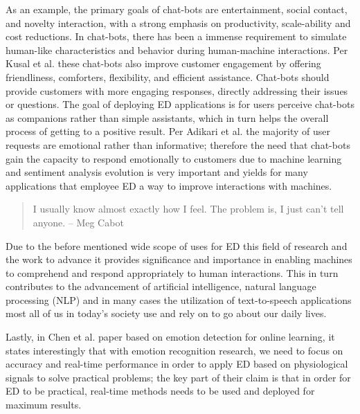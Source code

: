 \documentclass[11pt]{article}
\begin{document}
As an example, the primary goals of chat-bots are entertainment, social contact, and novelty interaction, with a strong emphasis on productivity, scale-ability and cost reductions. In chat-bots, there has been a immense requirement to simulate human-like characteristics and behavior during human-machine interactions\cite{emotion-detection-literature-review}. Per Kusal et al. \cite{chatbot-cognitive-awareness} these chat-bots also improve customer engagement by offering friendliness, comforters, flexibility, and efficient assistance. Chat-bots should provide customers with more engaging responses, directly addressing their issues or questions. The goal of deploying ED applications is for users perceive chat-bots as companions rather than simple assistants, which in turn helps the overall process of getting to a positive result. Per Adikari et al. the majority of user requests are emotional rather than informative; therefore the need that chat-bots gain the capacity to respond emotionally to customers due to machine learning and sentiment analysis evolution\cite{chatbot-cognitive-awareness} is very important and yields for many applications that employee ED a way to improve interactions with machines.

\begin{quote}
    I usually know almost exactly how I feel. The problem is, I just can’t tell anyone.
    \flushright -- Meg Cabot
\end{quote}

Due to the before mentioned wide scope of uses for ED this field of research and the work to advance it provides significance and importance in enabling machines to comprehend and respond appropriately to human interactions. This in turn contributes to the advancement of artificial intelligence, natural language processing (NLP) and in many cases the utilization of text-to-speech applications most all of us in today's society use and rely on \cite{ai-framework-detection-emotions} to go about our daily lives.

Lastly, in Chen et al.\cite{research-emotion-recognition-for-online-learning} paper based on emotion detection for online learning, it states interestingly that with emotion recognition research, we need to focus on accuracy and real-time performance in order to apply ED based on physiological signals to solve practical problems; the key part of their claim is that in order for ED to be practical, real-time methods needs to be used and deployed for maximum results.
\end{document}
